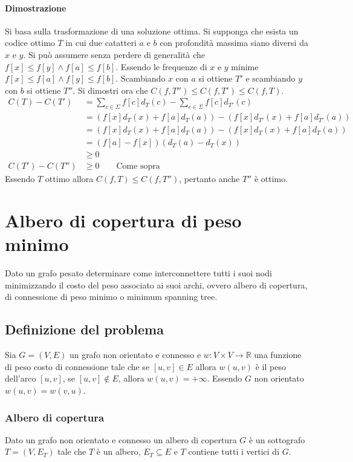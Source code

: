 \paragraph{Dimostrazione}
Si basa sulla trasformazione di una soluzione ottima. Si supponga che esista un codice ottimo $T$ in cui due catatteri $a$ e $b$ con profondit\`a massima siano diversi da $x$ e $y$. 
Si pu\`o assumere senza perdere di generalit\`a che $f[x]\le f[y]\land f[a]\le f[b]$. Essendo le frequenze di $x$ e $y$ minime $f[x]\le f[a]\land f[y]\le f[b]$. Scambiando $x$ con $a$
si ottiene $T'$ e scambiando $y$ con $b$ si ottiene $T''$. Si dimostri ora che $C(f, T'')\le C(f, T')\le C(f, T)$.
\begin{align*}
	C(T) - C(T') & = \sum\limits_{c\in \Sigma}f[c]d_T(c) - \sum\limits_{c\in\Sigma}f[c]d_{T'}(c)\\
	             & = (f[x]d_T(x)+f[a]d_T(a)) - (f[x]d_{T'}(x) + f[a]d_{T'}(a))\\
		     & = (f[x]d_T(x)+f[a]d_T(a)) - (f[x]d_{T}(x) + f[a]d_{T}(a))\\
		     & = (f[a] - f[x])(d_T(a) - d_T(x))\\
		     & \ge 0\\
	C(T') - C(T'') & \ge 0\quad\quad \text{Come sopra}
\end{align*}
Essendo $T$ ottimo allora $C(f, T)\le C(f, T'')$, pertanto anche $T''$ \`e ottimo.
\section{Albero di copertura di peso minimo}
Dato un grafo pesato determinare come interconnettere tutti i suoi nodi minimizzando il costo del peso associato ai suoi archi, ovvero albero di copertura, di connessione di peso minimo
o minimum spanning tree.
\subsection{Definizione del problema}
Sia $G=(V, E)$ un grafo non orientato e connesso e $w:V\times V\rightarrow\mathbb{R}$ una funzione di peso costo di connessione tale che se $[u, v]\in E$ allora $w(u, v)$ \`e il peso 
dell'arco $[u, v]$, se $[u, v]\not\in E$, allora $w(u, v)= + \infty$. Essendo $G$ non orientato $w(u, v) = w(v, u)$.
\subsubsection{Albero di copertura}
Dato un grafo non orientato e connesso un albero di copertura $G$ \`e un sottografo $T=(V, E_T)$ tale che $T$ \`e un albero, $E_T\subseteq E$ e $T$ contiene tutti i vertici di $G$. 
